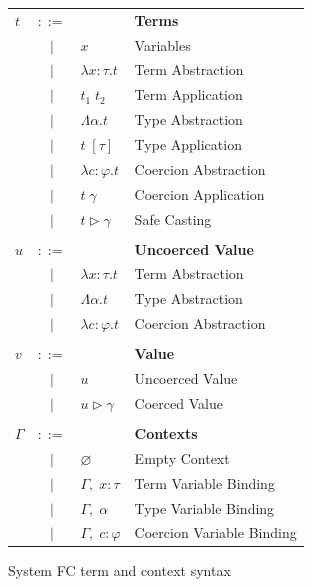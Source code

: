 \documentclass{sig-alternate}
\begin{document}
\begin{figure}[h!]
\begin{tabular}{lcll}
$t$ & $::=$ & & \textbf{Terms} \\
    & $|$   & $x$ & {\small Variables} \\
    & $|$   & $\lambda x:\tau.t$ & {\small Term Abstraction} \\
    & $|$   & $t_1\; t_2$ & {\small Term Application} \\
    & $|$   & $\Lambda \alpha.t$ & {\small Type Abstraction} \\
    & $|$   & $t\; [\tau]$ & {\small Type Application} \\
    & $|$   & $\lambda c:\varphi.t$ & {\small Coercion Abstraction} \\
    & $|$   & $t\; \gamma$ & {\small Coercion Application} \\
    & $|$   & $t \triangleright \gamma$ & {\small Safe Casting} \\
&&\; \hspace{.75in} \;& \\
$u$ & $::=$ & & \textbf{Uncoerced Value} \\
    & $|$   & $\lambda x:\tau.t$ & {\small Term Abstraction} \\
    & $|$   & $\Lambda \alpha.t$ & {\small Type Abstraction} \\
    & $|$   & $\lambda c:\varphi.t$ & {\small Coercion Abstraction} \\
&&\; \hspace{.75in} \;& \\
$v$ & $::=$ & & \textbf{Value} \\
    & $|$   & $u$ & {\small Uncoerced Value} \\
    & $|$   & $u \triangleright \gamma$ & {\small Coerced Value} \\
&&\; \hspace{.75in} \;& \\
$\Gamma$ & $::=$ & & \textbf{Contexts} \\
         & $|$   & $\varnothing$ & {\small Empty Context} \\
         & $|$   & $\Gamma,\; x:\tau$ & {\small Term Variable Binding} \\
         & $|$   & $\Gamma,\; \alpha$ & {\small Type Variable Binding} \\
         & $|$   & $\Gamma,\; c:\varphi$ & {\small Coercion Variable Binding}
\end{tabular}
\caption{System FC term and context syntax}
\label{fig:syntax-tex}
\end{figure}
\end{document}
